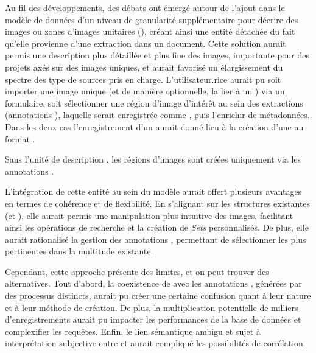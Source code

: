 Au fil des développements, des débats ont émergé autour de l'ajout dans
le modèle de données d'un niveau de granularité supplémentaire pour
décrire des images ou zones d'images unitaires
(\graphicals), créant ainsi une entité détachée du fait
qu'elle provienne d'une extraction dans un document. Cette solution
aurait permis une description plus détaillée et plus fine des images,
importante pour des projets axés sur des images uniques, et aurait
favorisé un élargissement du spectre des type de sources pris en charge.
L'utilisateur.rice aurait pu soit importer une image unique (et de manière
optionnelle, la lier à un \wit) via un formulaire, soit sélectionner
une région d'image d'intérêt au sein des extractions (annotations \sas),
laquelle serait enregistrée comme \graphical, puis l'enrichir de
métadonnées. Dans les deux cas l'enregistrement d'un \graphical
aurait donné lieu à la création d'une \digit au format \jpeg.

Sans l'unité de description \graphical, les régions d'images
sont créées uniquement via les annotations \sas.

L'intégration de cette entité au sein du modèle aurait offert plusieurs
avantages en termes de cohérence et de flexibilité. En s'alignant sur
les structures existantes (\wits et \sers), elle aurait permis une
manipulation plus intuitive des images, facilitant ainsi les opérations
de recherche et la création de \emph{Sets} personnalisés. De plus, elle
aurait rationalisé la gestion des annotations \sas, permettant de
sélectionner les plus pertinentes dans la multitude existante.

Cependant, cette approche présente des limites, et on peut trouver des
alternatives. Tout d'abord, la coexistence de \graphicals avec les
annotations \sas, générées par des processus distincts, aurait pu créer
une certaine confusion quant à leur nature et à leur méthode de
création. De plus, la multiplication potentielle de milliers
d'enregistrements aurait pu impacter les performances de la base de
données et complexifier les requêtes. Enfin, le lien sémantique ambigu
et sujet à interprétation subjective entre \graphical et \wit
aurait compliqué les possibilités de corrélation.

